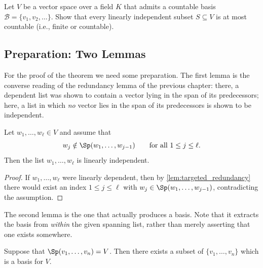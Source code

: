 \begin{exercise}
\label{exc:countable_basis_independent_subsets}
Let $V$ be a vector space over a field $K$ that admits a countable basis $\mathcal{B} = \{v_1, v_2, \dots\}$. Show that every linearly independent subset $S \subseteq V$ is at most countable (i.e., finite or countable).
\end{exercise}

\subsection{Preparation: Two Lemmas}

For the proof of the theorem we need some preparation. The first lemma is the converse reading of the redundancy lemma of the previous chapter: there, a dependent list was shown to contain a vector lying in the span of its predecessors; here, a list in which \emph{no} vector lies in the span of its predecessors is shown to be independent.

\begin{lemma}
\label{lem:no_predecessor_span}
Let $w_1, \dots, w_\ell \in V$ and assume that
\[
w_j \notin \Sp(w_1, \dots, w_{j-1}) \qquad \text{for all } 1 \le j \le \ell.
\]
Then the list $w_1, \dots, w_\ell$ is linearly independent.
\end{lemma}

\begin{proof}
If $w_1, \dots, w_\ell$ were linearly dependent, then by \cref{lem:targeted_redundancy} there would exist an index $1 \le j \le \ell$ with $w_j \in \Sp(w_1, \dots, w_{j-1})$, contradicting the assumption.
\end{proof}

The second lemma is the one that actually produces a basis. Note that it extracts the basis from \emph{within} the given spanning list, rather than merely asserting that one exists somewhere.

\begin{lemma}
\label{lem:spanning_list_contains_basis}
Suppose that $\Sp(v_1, \dots, v_n) = V$. Then there exists a subset of $\{v_1, \dots, v_n\}$ which is a basis for $V$.
\end{lemma}

